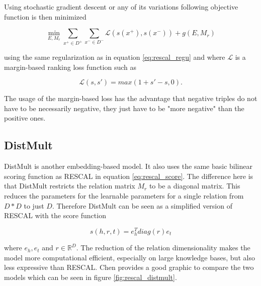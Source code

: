 Using stochastic gradient descent or any of its variations following objective function is then minimized 

\begin{equation}
\label{rescal_pairwise}
\min_{E,M_r} \sum_{x^+ \in D^+} \sum_{x^- \in D^-} \mathcal{L}(s(x^+), s(x^-)) + g(E, M_r)
\end{equation}

using the same regularization as in equation \ref{eq:rescal_regu} and where $\mathcal{L}$ is a margin-based ranking loss function such as

\begin{equation}
\label{eq:rescal_loss}
\mathcal{L}(s,s') = max(1+s'-s,0).
\end{equation}
 
The usage of the margin-based loss has the advantage that negative triples do not have to be necessarily negative, they just have to be "more negative" than the positive ones. 

\subsection{DistMult}
\label{cha:distmult}
DistMult \cite{yang_embedding_2015} is another embedding-based model. It also uses the same basic bilinear scoring function as RESCAL in equation \ref{eq:rescal_score}. The difference here is that DistMult restricts the relation matrix $M_r$ to be a diagonal matrix. This reduces the parameters for the learnable parameters for a single relation from $D*D$ to just $D$. Therefore DistMult can be seen as a simplified version of RESCAL with the score function

\begin{equation}
\label{eq:distmult_score}
s(h,r,t)=e_h^T diag(r) e_t
\end{equation}

where $e_h, e_t$ and $r\in \mathbb{R}^D$. The reduction of the relation dimensionality makes the model more computational efficient, especially on large knowledge bases, but also less expressive than RESCAL. Chen \cite{chen_knowledge_2020} provides a good graphic to compare the two models which can be seen in figure \ref{fig:rescal_distmult}.

